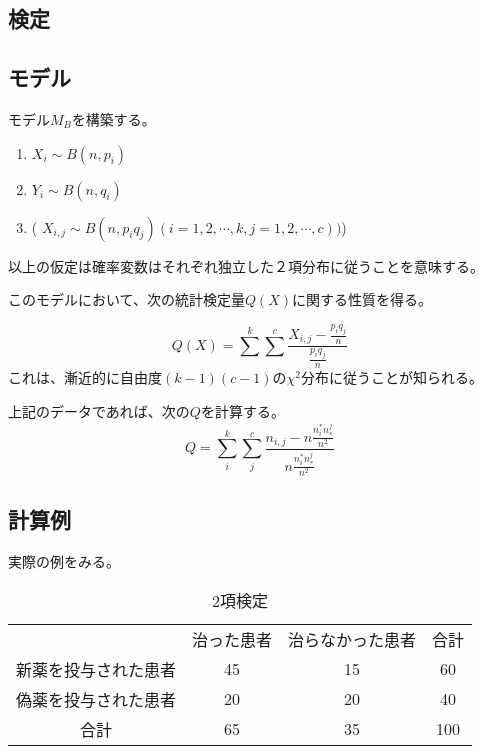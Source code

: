 \subsection{検定}


\subsection{モデル}
モデル$M_B$を構築する。
\begin{enumerate}
 \item $X_{i} \sim B(n,p_i)$
 \item $Y_{i} \sim B(n,q_i)$
 \item ( $X_{i,j} \sim B(n, p_i q_j)  (i=1,2,\cdots,k, j=1,2,\cdots,c))$)
\end{enumerate}
以上の仮定は確率変数はそれぞれ独立した２項分布に従うことを意味する。

このモデルにおいて、次の統計検定量$Q(X)$に関する性質を得る。

\begin{equation*}
 Q(X) = \sum^k \sum^c \frac{ X_{i,j} - \frac{p_i q_j}{n}}{\frac{p_i q_j}{n} }
\end{equation*}
これは、漸近的に自由度$(k-1)(c-1)$の$\chi^2$分布に従うことが知られる。

上記のデータであれば、次の$Q$を計算する。
\begin{equation*}
 Q = \sum_i^k \sum_j^c \frac{ n_{i,j} - n\frac{n_i^* n_*^j}{n^2}}{n\frac{n_i^* n_*^j}{n^2} }
\end{equation*}




\subsection{計算例}
実際の例をみる。

\begin{table}[hbtp]
 \caption{2項検定}
\begin{tabular}{c|cc|c}
 & 治った患者 & 治らなかった患者 & 合計 \\
 新薬を投与された患者&45 & 15& 60  \\
 偽薬を投与された患者&20 & 20 & 40 \\
 合計 & 65& 35& 100
\end{tabular}
\end{table}

